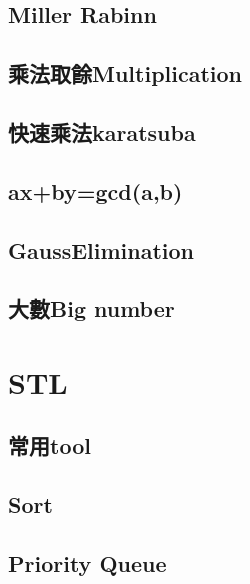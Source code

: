 \subsection{Miller Rabinn}


\subsection{乘法取餘Multiplication}


\subsection{快速乘法karatsuba}


\subsection{ax+by=gcd(a,b)}


\subsection{GaussElimination}


\subsection{大數Big number}


\section{STL}

\subsection{常用tool}


\subsection{Sort}


\subsection{Priority Queue}


